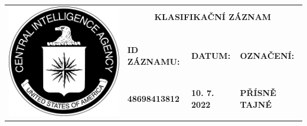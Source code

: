 \documentclass[a4paper, 11pt]{article}
\newcommand{\blackcell}{\cellcolor{black} \color{white} \ttfamily \bfseries}
\begin{document}
	\noindent
	\begin{table}[H]
		\renewcommand\tabularxcolumn[1]{m{#1}}
		\def\arraystretch{1.5}
		\begin{tabularx}{\textwidth}{l X X X}
			\multirow{4}{*}{ \includegraphics[scale=0.22]{sources/CIA_logo.pdf} } & \multicolumn{3}{c}{\bfseries \ttfamily \Huge KLASIFIKAČNÍ ZÁZNAM} \\
			&&&\\
			& \blackcell ID ZÁZNAMU: & \blackcell DATUM: & \blackcell OZNAČENÍ: \\
			& \blackcell 48698413812 & \blackcell 10. 7. 2022 & \blackcell PŘÍSNĚ TAJNÉ \\
			
		\end{tabularx}
	\end{table}
	
\end{document}
